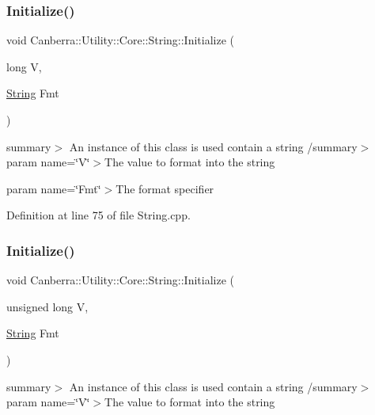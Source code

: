 \subsubsection{\texorpdfstring{Initialize()}{Initialize()}\hspace{0.1cm}{\footnotesize\ttfamily [1/8]}}
{\footnotesize\ttfamily void Canberra\+::\+Utility\+::\+Core\+::\+String\+::\+Initialize (\begin{DoxyParamCaption}\item[{long}]{V,  }\item[{\hyperlink{class_canberra_1_1_utility_1_1_core_1_1_string}{String}}]{Fmt }\end{DoxyParamCaption})\hspace{0.3cm}{\ttfamily [protected]}}

summary$>$ An instance of this class is used contain a string /summary$>$ param name=\char`\"{}\+V\char`\"{}$>$The value to format into the string

param name=\char`\"{}\+Fmt\char`\"{}$>$The format specifier

Definition at line 75 of file String.\+cpp.

\mbox{\label{class_canberra_1_1_utility_1_1_core_1_1_string_aeceb9ed891eaff482a79c17b27af6078_aeceb9ed891eaff482a79c17b27af6078}} 
\subsubsection{\texorpdfstring{Initialize()}{Initialize()}\hspace{0.1cm}{\footnotesize\ttfamily [2/8]}}
{\footnotesize\ttfamily void Canberra\+::\+Utility\+::\+Core\+::\+String\+::\+Initialize (\begin{DoxyParamCaption}\item[{unsigned long}]{V,  }\item[{\hyperlink{class_canberra_1_1_utility_1_1_core_1_1_string}{String}}]{Fmt }\end{DoxyParamCaption})\hspace{0.3cm}{\ttfamily [protected]}}

summary$>$ An instance of this class is used contain a string /summary$>$ param name=\char`\"{}\+V\char`\"{}$>$The value to format into the string

